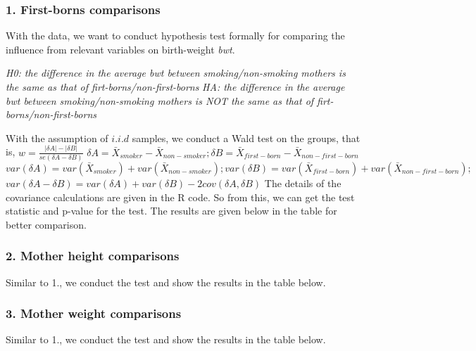 \documentclass{article}
\begin{document}
\subsubsection*{1. First-borns comparisons}
\hspace{12 pt} With the data, we want to conduct
hypothesis test formally for comparing the influence from relevant
variables on birth-weight \textit{bwt}. \newline


\hspace{12 pt} \textit{H0: the difference in the average bwt between smoking/non-smoking mothers is the same as that of firt-borns/non-first-borns} \newline
\vspace{2 pt}
\hspace{24 pt} \textit{HA: the difference in the average bwt between
  smoking/non-smoking mothers is NOT the same as that of firt-borns/non-first-borns} \newline


With the assumption of $i.i.d$ samples, we conduct a Wald test on the
groups, that is, \newline
$w = \displaystyle \frac{|\delta A| - |\delta B|}{se(\delta A - \delta  B)}$\newline
$\delta A=\bar X_{smoker} - \bar X_{non-smoker}; 
\delta B=\bar X_{first-born} - \bar X_{non-first-born}$\newline
$var(\delta A) = var(\bar X_{smoker})+var(\bar X_{non-smoker});
var(\delta B) = var(\bar X_{first-born})+var(\bar X_{non-first-born});$\newline
$var(\delta A - \delta B) = var(\delta A) + var(\delta B) -
2cov(\delta A, \delta B)$\newline
The details of the covariance calculations are given in the R code. So
from this, we can get the test statistic and p-value for the test. The
results are given below in the table for better comparison.

\subsubsection*{2. Mother height comparisons}
\hspace{12 pt} Similar to 1., we conduct the test and show the results
in the table below.

\subsubsection*{3. Mother weight comparisons}
\hspace{12 pt} Similar to 1., we conduct the test and show the results
in the table below.
\end{document}
